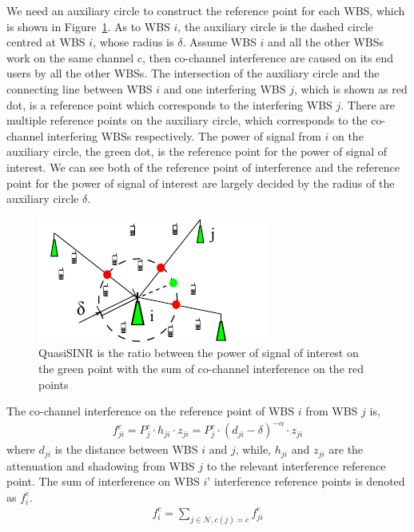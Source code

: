 \documentclass[times]{ettauth}
\theoremstyle{mytheoremstyle}
\theoremstyle{mytheoremstyle}
\theoremstyle{mytheoremstyle}
\begin{document}
We need an auxiliary circle to construct the reference point for each WBS, which is shown in Figure~\ref{quasiSINRfigure}. %
As to WBS $i$, the auxiliary circle is the dashed circle centred at WBS $i$, whose radius is $\delta$.
Assume WBS $i$ and all the other WBSs work on the same channel $c$, then co-channel interference are caused on its end users by all the other WBSs.
The intersection of the auxiliary circle and the connecting line between WBS $i$ and one interfering WBS $j$, which is shown as red dot, is a reference point which corresponds to the interfering WBS $j$.
There are multiple reference points on the auxiliary circle, which corresponds to the co-channel interfering WBSs respectively.
The power of signal from $i$ on the auxiliary circle, the green dot, is the reference point for the power of signal of interest.
We can see both of the reference point of interference and the reference point for the power of signal of interest are largely decided by the radius of the auxiliary circle $\delta$.

\begin{figure}[h!]
  \centering
  \includegraphics[width=0.6\linewidth]{quasiSINR2_2.pdf}
  \caption{QuasiSINR is the ratio between the power of signal of interest on the green point with the sum of co-channel interference on the red points}
\label{quasiSINRfigure}
\end{figure}


The co-channel interference on the reference point of WBS $i$ from WBS $j$ is,
\begin{equation}
\label{quasiSINR_inf}
\begin{aligned}
f_{ji}^c = P_{j}^c\cdot h_{ji}\cdot z_{ji} = P_{j}^c\cdot (d_{ji}-\delta)^{-\alpha}\cdot z_{ji}
\end{aligned}
\end{equation}
where $d_{ji}$ is the distance between WBS $i$ and $j$, while, $h_{ji}$ and $z_{ji}$ are the attenuation and shadowing from WBS $j$ to the relevant interference reference point.
The sum of interference on WBS $i$' interference reference points is denoted as $f_{i}^c$.
\begin{equation}
\label{quasiSINR_infs}
\begin{aligned}
f_{i}^c = \sum_{j\in\mathcal{N}, c(j)= c} f_{ji}^c
\end{aligned}
\end{equation}
\end{document}
